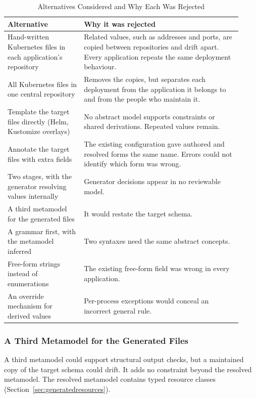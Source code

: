\begin{table}[!htbp]
\centering
\small
\begin{tabular}{>{\raggedright\arraybackslash}p{0.30\linewidth}>{\raggedright\arraybackslash}p{0.62\linewidth}}
\hline
\textbf{Alternative} & \textbf{Why it was rejected} \\
\hline
Hand-written Kubernetes files in each application's repository &
  Related values, such as addresses and ports, are copied between repositories
  and drift apart. Every application repeats the same deployment behaviour. \\
All Kubernetes files in one central repository &
  Removes the copies, but separates each deployment from the application it
  belongs to and from the people who maintain it. \\
Template the target files directly (Helm, Kustomize overlays) &
  No abstract model supports constraints or shared derivations. Repeated values
  remain. \\
Annotate the target files with extra fields &
  The existing configuration gave authored and resolved forms the same name.
  Errors could not identify which form was wrong. \\
Two stages, with the generator resolving values internally &
  Generator decisions appear in no reviewable model. \\
A third metamodel for the generated files &
  It would restate the target schema. \\
A grammar first, with the metamodel inferred &
  Two syntaxes need the same abstract concepts. \\
Free-form strings instead of enumerations &
  The existing free-form field was wrong in every application. \\
An override mechanism for derived values &
  Per-process exceptions would conceal an incorrect general rule. \\
\hline
\end{tabular}
\caption{Alternatives Considered and Why Each Was Rejected}
\label{tab:alternatives}
\end{table}

\subsubsection{A Third Metamodel for the Generated Files}
\label{sec:thirdmetamodel}

A third metamodel could support structural output checks, but a maintained copy
of the target schema could drift. It adds no constraint beyond the resolved
metamodel. The resolved metamodel contains typed resource classes
(Section~\ref{sec:generatedresources}).

